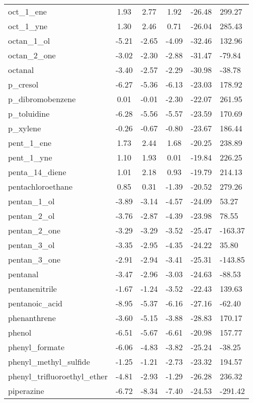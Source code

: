 \documentclass{amsart}
\begin{document}
\begin{longtable}{L|C|C|C|X|X}
oct\_1\_ene & 1.93 & 2.77 & 1.92 & -26.48 & 299.27 \\ 
oct\_1\_yne & 1.30 & 2.46 & 0.71 & -26.04 & 285.43 \\ 
octan\_1\_ol & -5.21 & -2.65 & -4.09 & -32.46 & 132.96 \\ 
octan\_2\_one & -3.02 & -2.30 & -2.88 & -31.47 & -79.84 \\ 
octanal & -3.40 & -2.57 & -2.29 & -30.98 & -38.78 \\ 
p\_cresol & -6.27 & -5.36 & -6.13 & -23.03 & 178.92 \\ 
p\_dibromobenzene & 0.01 & -0.01 & -2.30 & -22.07 & 261.95 \\ 
p\_toluidine & -6.28 & -5.56 & -5.57 & -23.59 & 170.69 \\ 
p\_xylene & -0.26 & -0.67 & -0.80 & -23.67 & 186.44 \\ 
pent\_1\_ene & 1.73 & 2.44 & 1.68 & -20.25 & 238.89 \\ 
pent\_1\_yne & 1.10 & 1.93 & 0.01 & -19.84 & 226.25 \\ 
penta\_14\_diene & 1.01 & 2.18 & 0.93 & -19.79 & 214.13 \\ 
pentachloroethane & 0.85 & 0.31 & -1.39 & -20.52 & 279.26 \\ 
pentan\_1\_ol & -3.89 & -3.14 & -4.57 & -24.09 & 53.27 \\ 
pentan\_2\_ol & -3.76 & -2.87 & -4.39 & -23.98 & 78.55 \\ 
pentan\_2\_one & -3.29 & -3.29 & -3.52 & -25.47 & -163.37 \\ 
pentan\_3\_ol & -3.35 & -2.95 & -4.35 & -24.22 & 35.80 \\ 
pentan\_3\_one & -2.91 & -2.94 & -3.41 & -25.31 & -143.85 \\ 
pentanal & -3.47 & -2.96 & -3.03 & -24.63 & -88.53 \\ 
pentanenitrile & -1.67 & -1.24 & -3.52 & -22.43 & 139.63 \\ 
pentanoic\_acid & -8.95 & -5.37 & -6.16 & -27.16 & -62.40 \\ 
phenanthrene & -3.60 & -5.15 & -3.88 & -28.83 & 170.17 \\ 
phenol & -6.51 & -5.67 & -6.61 & -20.98 & 157.77 \\ 
phenyl\_formate & -6.06 & -4.83 & -3.82 & -25.24 & -38.25 \\ 
phenyl\_methyl\_sulfide & -1.25 & -1.21 & -2.73 & -23.32 & 194.57 \\ 
phenyl\_trifluoroethyl\_ether & -4.81 & -2.93 & -1.29 & -26.28 & 236.32 \\ 
piperazine & -6.72 & -8.34 & -7.40 & -24.53 & -291.42 \\ 

\end{longtable}
\end{document}
